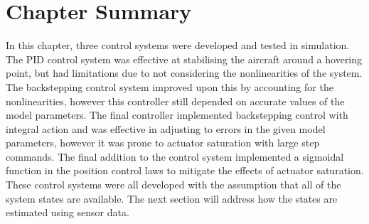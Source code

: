 \FloatBarrier
\section{Chapter Summary}
In this chapter, three control systems were developed and tested in simulation. The PID control system was effective at stabilising the aircraft around a hovering point, but had limitations due to not considering the nonlinearities of the system. The backstepping control system improved upon this by accounting for the nonlinearities, however this controller still depended on accurate values of the model parameters. The final controller implemented backstepping control with integral action and was effective in adjusting to errors in the given model parameters, however it was prone to actuator saturation with large step commands. The final addition to the control system implemented a sigmoidal function in the position control laws to mitigate the effects of actuator saturation. These control systems were all developed with the assumption that all of the  system states are available. The next section will address how the states are estimated using sensor data.



\clearpage



